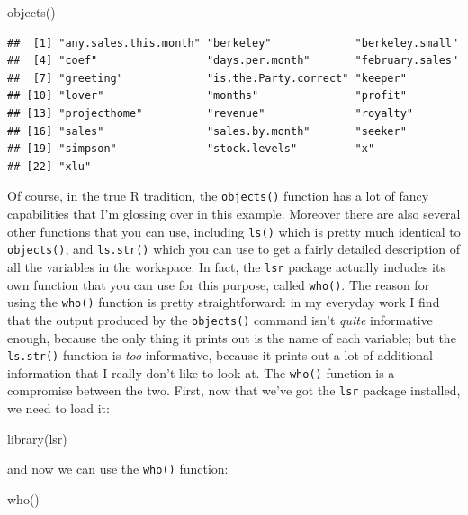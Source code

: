\documentclass[
]{book}
\newenvironment{Shaded}{\begin{snugshade}}{\end{snugshade}}
\newcommand{\FunctionTok}[1]{\textcolor[rgb]{0.00,0.00,0.00}{#1}}
\newcommand{\NormalTok}[1]{#1}
\begin{document}
\begin{Shaded}
\begin{Highlighting}[]
\FunctionTok{objects}\NormalTok{()}
\end{Highlighting}
\end{Shaded}

\begin{verbatim}
##  [1] "any.sales.this.month" "berkeley"             "berkeley.small"      
##  [4] "coef"                 "days.per.month"       "february.sales"      
##  [7] "greeting"             "is.the.Party.correct" "keeper"              
## [10] "lover"                "months"               "profit"              
## [13] "projecthome"          "revenue"              "royalty"             
## [16] "sales"                "sales.by.month"       "seeker"              
## [19] "simpson"              "stock.levels"         "x"                   
## [22] "xlu"
\end{verbatim}

Of course, in the true R tradition, the \texttt{objects()} function has a lot of fancy capabilities that I'm glossing over in this example. Moreover there are also several other functions that you can use, including \texttt{ls()} which is pretty much identical to \texttt{objects()}, and \texttt{ls.str()} which you can use to get a fairly detailed description of all the variables in the workspace. In fact, the \texttt{lsr} package actually includes its own function that you can use for this purpose, called \texttt{who()}. The reason for using the \texttt{who()} function is pretty straightforward: in my everyday work I find that the output produced by the \texttt{objects()} command isn't \emph{quite} informative enough, because the only thing it prints out is the name of each variable; but the \texttt{ls.str()} function is \emph{too} informative, because it prints out a lot of additional information that I really don't like to look at. The \texttt{who()} function is a compromise between the two. First, now that we've got the \texttt{lsr} package installed, we need to load it:

\begin{Shaded}
\begin{Highlighting}[]
\FunctionTok{library}\NormalTok{(lsr)}
\end{Highlighting}
\end{Shaded}

and now we can use the \texttt{who()} function:

\begin{Shaded}
\begin{Highlighting}[]
\FunctionTok{who}\NormalTok{()}
\end{Highlighting}
\end{Shaded}
\end{document}
